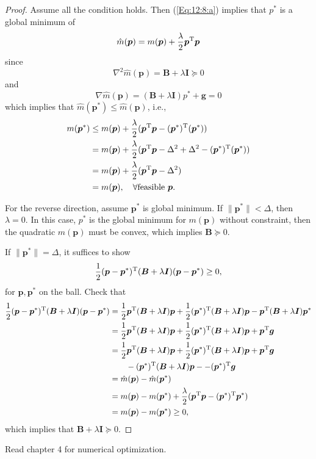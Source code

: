 \begin{proof}
Assume all the condition holds. Then (\ref{Eq:12:8:a}) implies that $p^*$ is a global minimum of
\[
\hat m(\bm p)=m(\bm p)+\frac{\lambda}{2}\bm p^{\mathrm T}\bm p
\]
since
\[
\nabla^2\hat m(\bm p)=\bm B+\lambda\bm I\succeq0
\]
and
\[
\nabla \hat m(\bm p)=(\bm B+\lambda\bm I)p^*+\bm g=0
\]
which implies that $\hat m(\bm p^*)\le \hat m(\bm p)$, i.e.,
\begin{align*}
m(\bm p^*)&\le m(\bm p)+\frac{\lambda}{2}(\bm p^{\mathrm T}\bm p-(\bm p^*)^{\mathrm T}(\bm p^*))\\
&=m(\bm p)+\frac{\lambda}{2}(\bm p^{\mathrm T}\bm p-\Delta^2+\Delta^2-(\bm p^*)^{\mathrm T}(\bm p^*))\\
&=m(\bm p)+\frac{\lambda}{2}(\bm p^{\mathrm T}\bm p-\Delta^2)\\
&=m(\bm p),\quad\forall \mbox{feasible }\bm p.
\end{align*}

For the reverse direction, assume $\bm p^*$ is global minimum. If $\|\bm p^*\|<\Delta$, then $\lambda=0$. In this case, $p^*$ is the global minimum for $m(\bm p)$ without constraint, then the quadratic $m(\bm p)$ must be convex, which implies $\bm B\succeq0$.

If $\|\bm p^*\|=\Delta$, it suffices to show 
\[
\frac{1}{2}(\bm p-\bm p^*)^{\mathrm T}(\bm B+\lambda\bm I)(\bm p-\bm p^*)\ge0,
\]
for $\bm p,\bm p^*$ on the ball. Check that
\begin{align*}
\frac{1}{2}(\bm p-\bm p^*)^{\mathrm T}(\bm B+\lambda\bm I)(\bm p-\bm p^*)&=\frac{1}{2}\bm p^{\mathrm T}(\bm B+\lambda\bm I)\bm p+\frac{1}{2}(\bm p^*)^{\mathrm T}(\bm B+\lambda\bm I)\bm p-\bm p^{\mathrm T}(\bm B+\lambda\bm I)\bm p^*\\
&=\frac{1}{2}\bm p^{\mathrm T}(\bm B+\lambda\bm I)\bm p+\frac{1}{2}(\bm p^*)^{\mathrm T}(\bm B+\lambda\bm I)\bm p
+
\bm p^{\mathrm T}\bm g\\
&=\frac{1}{2}\bm p^{\mathrm T}(\bm B+\lambda\bm I)\bm p+\frac{1}{2}(\bm p^*)^{\mathrm T}(\bm B+\lambda\bm I)\bm p
+
\bm p^{\mathrm T}\bm g\\
&\qquad-(\bm p^*)^{\mathrm T}(\bm B+\lambda\bm I)\bm p
-
-(\bm p^*)^{\mathrm T}\bm g\\
&=\hat m(\bm p) - \hat m(\bm p^*)
\\
&=m(\bm p) - m(\bm p^*) + \frac{\lambda}{2}(\bm p^{\mathrm T}\bm p-(\bm p^*)^{\mathrm T}\bm p^*)\\
&= m(\bm p) - m(\bm p^*)\ge0,
\end{align*}
which implies that $\bm B+\lambda\bm I\succeq0$.
\end{proof}
Read chapter 4 for numerical optimization.

